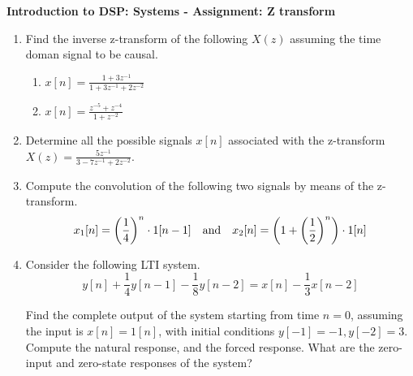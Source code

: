\documentclass[9pt]{article}
\def\lp{\ensuremath\left(}
\def\rp{\ensuremath\right)}
\begin{document}
\begin{center}
    \begin{Large}
        \textbf{Introduction to DSP: Systems - Assignment: Z transform}
    \end{Large}
\end{center}
\vspace{0.2cm}

\begin{multicols}{2}
    \begin{enumerate}
        \item Find the inverse z-transform of the following $X(z)$ assuming the time doman signal to be causal.
        \begin{enumerate}
            \item $x[n] = \frac{1 + 3z^{-1}}{1 + 3z^{-1} + 2z^{-2}}$
            \item $x[n] = \frac{z^{-5} + z^{-4}}{1 + z^{-2}}$
        \end{enumerate}

        \item Determine all the possible signals $x[n]$ associated with the z-transform $X(z) = \frac{5z^{-1}}{3 - 7z^{-1} + 2z^{-2}}$.

        \item Compute the convolution of the following two signals by means of the z-transform.
        \[ x_1[n] = \lp \frac{1}{4} \rp^n \cdot 1[n-1] \quad \text{and} \quad x_2[n] = \lp 1 + \lp \frac{1}{2} \rp^n\rp \cdot 1[n] \]

        \item Consider the following LTI system. 
        \[ y[n] + \frac{1}{4}y[n-1] -\frac{1}{8}y[n-2] = x[n] - \frac{1}{3}x[n-2] \]

        Find the complete output of the system starting from time $n=0$, assuming the input is $x[n] = 1[n]$, with initial conditions $y[-1] = -1, y[-2] = 3$. Compute the natural response, and the forced response. What are the zero-input and zero-state responses of the system? 
    \end{enumerate}
    \vfill
\end{multicols}
\end{document}
